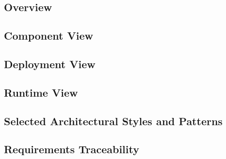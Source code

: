 \subsection{Overview}
\label{sect:architecture:overview}


\subsection{Component View}
\label{sect:architecture:components}


\subsection{Deployment View}
\label{sect:architecture:deployment}


\subsection{Runtime View}
\label{sect:architecture:runtime}


\subsection{Selected Architectural Styles and Patterns}
\label{sect:architecture:patterns}


\subsection{Requirements Traceability}
\label{sect:architecture:traceability}
